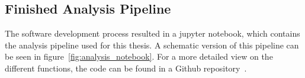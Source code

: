 \subsection{Finished Analysis Pipeline}
The software development process resulted in a jupyter notebook, which contains the analysis pipeline used for this thesis. A schematic version of this pipeline can be seen in figure~\ref{fig:analysis_notebook}. For a more detailed view on the different functions, the code can be found in a Github repository~\cite{code}. 


